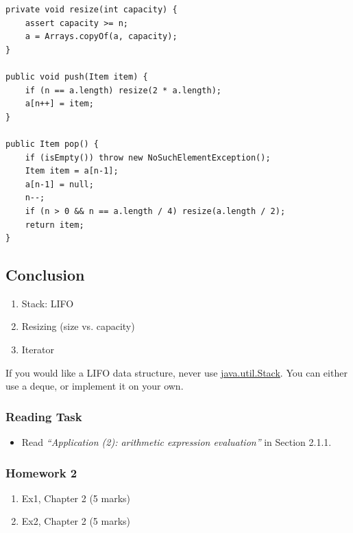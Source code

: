 \documentclass[aspectratio=169, 14pt]{beamer}
\begin{document}
\begin{frame}[fragile]
    \begin{verbatim}
private void resize(int capacity) {
    assert capacity >= n;
    a = Arrays.copyOf(a, capacity);
}

public void push(Item item) {
    if (n == a.length) resize(2 * a.length);
    a[n++] = item;
}

public Item pop() {
    if (isEmpty()) throw new NoSuchElementException();
    Item item = a[n-1];
    a[n-1] = null;
    n--;
    if (n > 0 && n == a.length / 4) resize(a.length / 2);
    return item;
}
    \end{verbatim}
\end{frame}

\begin{frame}
\section{\textcolor{darkmidnightblue}{Conclusion}}
    \begin{enumerate}
        \item Stack: LIFO
        \item Resizing (size vs. capacity)
        \item Iterator
    \end{enumerate}
\end{frame}

{
\begin{frame}[standout]
  If you would like a LIFO data structure, never use \href{https://docs.oracle.com/en/java/javase/11/docs/api/java.base/java/util/Stack.html}{java.util.Stack}. You can either use a \alert{deque}, or implement it on your own.
\end{frame}
}

\begin{frame}
    \frametitle{Reading Task }
    \begin{itemize}
        \item  Read \emph{``Application (2): arithmetic expression evaluation''} in Section 2.1.1.
    \end{itemize}

\end{frame}

\begin{frame}
    \frametitle{Homework 2}
    \begin{enumerate}
        \item Ex1, Chapter 2 (5 marks)
        \item Ex2, Chapter 2 (5 marks)
    \end{enumerate}
\end{frame}
\end{document}
